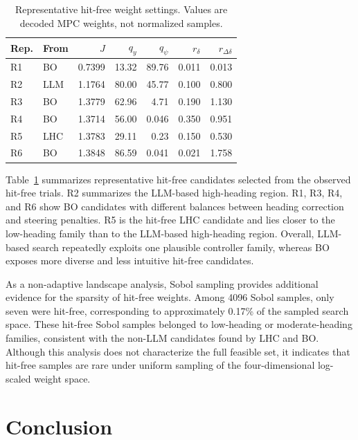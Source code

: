 \documentclass[10pt,twocolumn]{ICCAS}
\begin{document}
\begin{table}[t]
\caption{Representative hit-free weight settings. Values are decoded MPC weights,
not normalized samples.}
\label{tab:solution_families}
\centering
\setlength{\tabcolsep}{5.8pt}
\begin{tabular}{@{}llrrrrr@{}}
\hline
Rep. & From & $J$ & $q_y$ & $q_\psi$ & $r_\delta$ & $r_{\Delta\delta}$ \\
\hline
R1 & BO & 0.7399 & 13.32 & 89.76 & 0.011 & 0.013 \\
R2 & LLM & 1.1764 & 80.00 & 45.77 & 0.100 & 0.800 \\
R3 & BO & 1.3779 & 62.96 & 4.71 & 0.190 & 1.130 \\
R4 & BO & 1.3714 & 56.00 & 0.046 & 0.350 & 0.951 \\
R5 & LHC & 1.3783 & 29.11 & 0.23 & 0.150 & 0.530 \\
R6 & BO & 1.3848 & 86.59 & 0.041 & 0.021 & 1.758 \\
\hline
\end{tabular}
\end{table}

Table~\ref{tab:solution_families} summarizes representative hit-free candidates
selected from the observed hit-free trials. R2 summarizes the LLM-based high-heading region. R1, R3, R4, and R6 show BO
candidates with different balances between heading correction and steering
penalties. R5 is the hit-free LHC candidate and lies closer to the low-heading
family than to the LLM-based high-heading region. Overall, LLM-based search
repeatedly exploits one plausible controller family, whereas BO exposes more
diverse and less intuitive hit-free candidates.

As a non-adaptive landscape analysis, Sobol sampling provides additional evidence
for the sparsity of hit-free weights. Among 4096 Sobol samples, only seven were
hit-free, corresponding to approximately 0.17\% of the sampled search space.
These hit-free Sobol samples belonged to low-heading or moderate-heading
families, consistent with the non-LLM candidates found by LHC and BO. Although
this analysis does not characterize the full feasible set, it indicates that
hit-free samples are rare under uniform sampling of the four-dimensional
log-scaled weight space.

\section{Conclusion}
\label{sec:conclusion}
\end{document}
